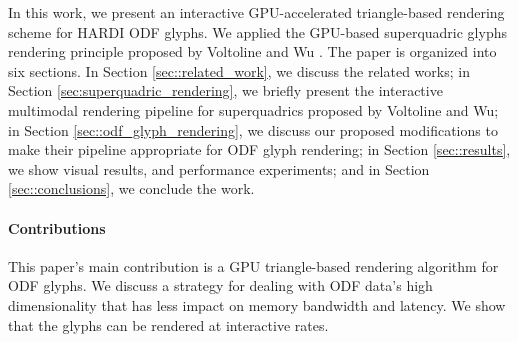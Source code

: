 \documentclass[twoside,twocolumn,10pt]{article}
\begin{document}
In this work, we present an interactive GPU-accelerated triangle-based rendering scheme for HARDI ODF glyphs. We applied the GPU-based superquadric glyphs rendering principle proposed by Voltoline and Wu \cite{voltoline2021}.
The paper is organized into six sections. In Section \ref{sec::related_work}, we discuss the related works; in Section \ref{sec:superquadric_rendering}, we briefly present the interactive multimodal rendering pipeline for superquadrics proposed by Voltoline and Wu; in Section \ref{sec::odf_glyph_rendering}, we discuss our proposed modifications to make their pipeline appropriate for ODF glyph rendering; in Section \ref{sec::results}, we show visual results, and performance experiments; and in Section \ref{sec::conclusions}, we conclude the work.

\paragraph*{\textbf{Contributions}}

This paper's main contribution is a GPU triangle-based rendering algorithm for ODF glyphs. We discuss a strategy for dealing with ODF data's high dimensionality that has less impact on memory bandwidth and latency. We show that the glyphs can be rendered at interactive rates.

\end{document}
